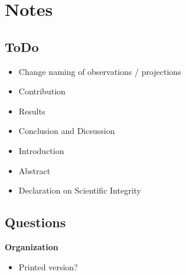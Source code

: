 \chapter{Notes}

\section{ToDo}
\begin{itemize}
    \item Change naming of observations / projections
    \item Contribution 
    \item Results
    \item Conclusion and Dicsussion
    \item Introduction
    \item Abstract
    \item Declaration on Scientific Integrity
\end{itemize}

\section{Questions}

\textbf{Organization}
\begin{itemize}
    \item Printed version?
\end{itemize}

